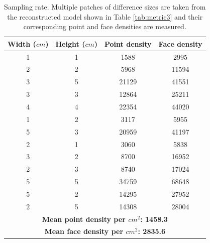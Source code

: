 \documentclass[final,12pt,3p]{elsarticle}
\begin{document}
\begin{table}[!ht]
\centering
\begin{tabular}{| c | c | c | c |}
   \hline
   \textbf{ Width ($cm$)} & \textbf{ Height ($cm$)} & Point density & Face density\\
   \hline
	1 & 1 & 1588 & 2995\\
	\hline
	2 & 2 & 5968 & 11594\\
	\hline
	3 & 5 & 21129 & 41551\\
	\hline
	3 & 3 & 12864 & 25211\\
	\hline
	4 & 4 & 22354 & 44020\\
	\hline
	1 & 2 & 3117 & 5955\\
	\hline
	5 & 3 & 20959 & 41197\\
	\hline
	2 & 1 & 3060 & 5838\\
	\hline
	3 & 2 & 8700 & 16952\\
	\hline
	2 & 3 & 8740 & 17024\\
	\hline
	5 & 5 & 34759 & 68648\\
	\hline
	5 & 2 & 14295 & 27952\\	
   \hline
	2 & 5 & 14308 & 28004\\
   \hline
   \multicolumn{4}{|c|}{\textbf{Mean point density per $cm^2$: 1458.3}}\\
   \hline
   \multicolumn{4}{|c|}{\textbf{Mean face density per $cm^2$: 2835.6}}\\
   \hline
\end{tabular}
  \caption{\label{tab:metric4} Sampling rate. Multiple patches of difference sizes are taken from the reconstructed model shown in Table \ref{tab:metric3} and their corresponding point and face densities are measured.}
  \end{table}
  
\end{document}
